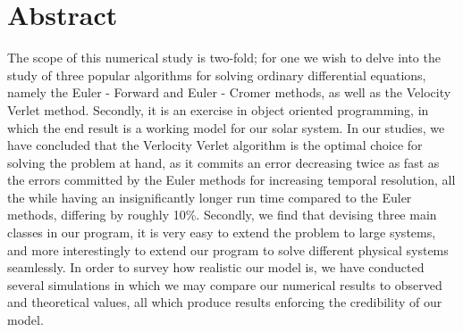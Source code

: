 \section{Abstract}
	The scope of this numerical study is two-fold; for one we wish to delve into the study of three popular algorithms for solving ordinary differential equations, namely the Euler - Forward and Euler - Cromer methods, as well as the Velocity Verlet method. Secondly, it is an exercise in object oriented programming, in which the end result is a working model for our solar system. In our studies, we have concluded that the Verlocity Verlet algorithm is the optimal choice for solving the problem at hand, as it commits an error decreasing twice as fast as the errors committed by the Euler methods for increasing temporal resolution, all the while having an insignificantly longer run time compared to the Euler methods, differing by roughly 10\%. Secondly, we find that devising three main classes in our program, it is very easy to extend the problem to large systems, and more interestingly to extend our program to solve different physical systems seamlessly. In order to survey how realistic our model is, we have conducted several simulations in which we may compare our numerical results to observed and theoretical values, all which produce results enforcing the credibility of our model.  \\